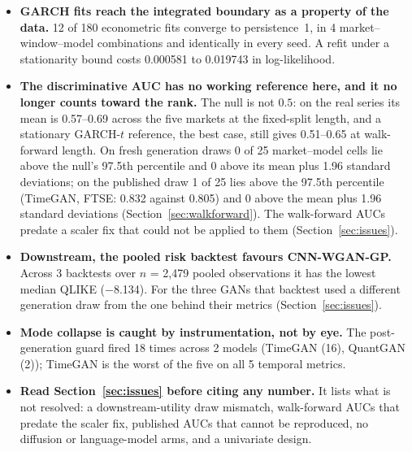\documentclass[11pt,a4paper]{article}
\makeatletter
\DeclareRobustCommand{\_}{\ifmmode\nfss@text{\textunderscore}\else\textunderscore\allowbreak\fi}
\makeatother
\begin{document}
\begin{itemize}[leftmargin=1.3em,itemsep=6pt]
\item \textbf{GARCH fits reach the integrated boundary as a property of the data.} 12 of 180 econometric fits converge to persistence~1, in 4 market--window--model combinations and identically in every seed. A refit under a stationarity bound costs 0.000581 to 0.019743 in log-likelihood.
\item \textbf{The discriminative AUC has no working reference here, and it no longer counts toward the rank.} The null is not $0.5$: on the real series its mean is 0.57--0.69 across the five markets at the fixed-split length, and a stationary GARCH-$t$ reference, the best case, still gives 0.51--0.65 at walk-forward length. On fresh generation draws 0 of 25 market--model cells lie above the null's 97.5th percentile and 0 above its mean plus 1.96 standard deviations; on the published draw 1 of 25 lies above the 97.5th percentile (TimeGAN, FTSE: 0.832 against 0.805) and 0 above the mean plus 1.96 standard deviations (Section~\ref{sec:walkforward}). The walk-forward AUCs predate a scaler fix that could not be applied to them (Section~\ref{sec:issues}).
\item \textbf{Downstream, the pooled risk backtest favours CNN-WGAN-GP.} Across 3 backtests over $n$ = 2,479 pooled observations it has the lowest median QLIKE ($-$8.134). For the three GANs that backtest used a different generation draw from the one behind their metrics (Section~\ref{sec:issues}).
\item \textbf{Mode collapse is caught by instrumentation, not by eye.} The post-generation guard fired 18 times across 2 models (TimeGAN (16), QuantGAN (2)); TimeGAN is the worst of the five on all 5 temporal metrics.
\item \textbf{Read Section~\ref{sec:issues} before citing any number.} It lists what is not resolved: a downstream-utility draw mismatch, walk-forward AUCs that predate the scaler fix, published AUCs that cannot be reproduced, no diffusion or language-model arms, and a univariate design.
\end{itemize}

\end{document}
